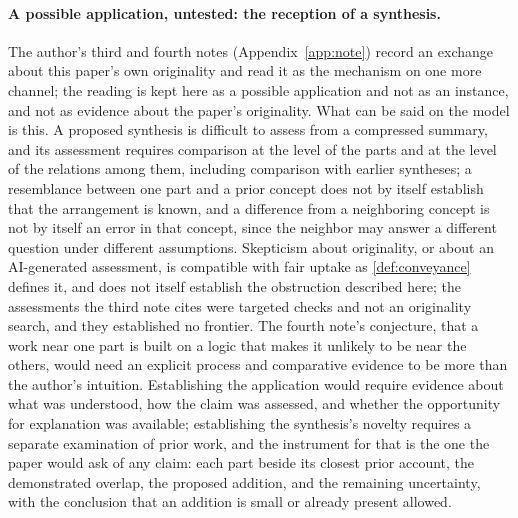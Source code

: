 \paragraph{A possible application, untested: the reception of a synthesis.} The author's third and fourth notes (Appendix~\ref{app:note}) record an exchange about this paper's own originality and read it as the mechanism on one more channel; the reading is kept here as a possible application and not as an instance, and not as evidence about the paper's originality. What can be said on the model is this. A proposed synthesis is difficult to assess from a compressed summary, and its assessment requires comparison at the level of the parts and at the level of the relations among them, including comparison with earlier syntheses; a resemblance between one part and a prior concept does not by itself establish that the arrangement is known, and a difference from a neighboring concept is not by itself an error in that concept, since the neighbor may answer a different question under different assumptions. Skepticism about originality, or about an AI-generated assessment, is compatible with fair uptake as \autoref{def:conveyance} defines it, and does not itself establish the obstruction described here; the assessments the third note cites were targeted checks and not an originality search, and they established no frontier. The fourth note's conjecture, that a work near one part is built on a logic that makes it unlikely to be near the others, would need an explicit process and comparative evidence to be more than the author's intuition. Establishing the application would require evidence about what was understood, how the claim was assessed, and whether the opportunity for explanation was available; establishing the synthesis's novelty requires a separate examination of prior work, and the instrument for that is the one the paper would ask of any claim: each part beside its closest prior account, the demonstrated overlap, the proposed addition, and the remaining uncertainty, with the conclusion that an addition is small or already present allowed.

